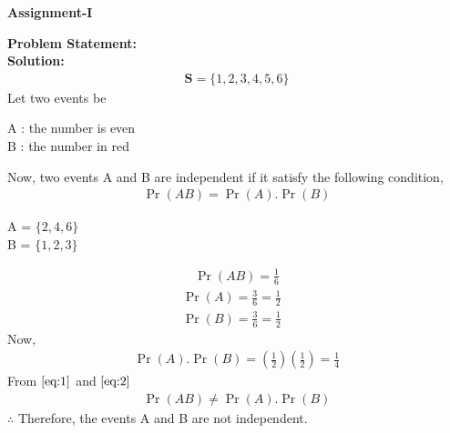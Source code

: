 \documentclass[10pt,a4paper]{report}
\providecommand{\pr}[1]{\ensuremath{\Pr\left(#1\right)}}
\newcommand{\problem}{\noindent \textbf{Problem Statement: }}
\newcommand{\solution}{\noindent \textbf{Solution: }}
\let\vec\mathbf
\let\vec\mathbf
\begin{document}
\hspace{8.05cm}\textbf{Assignment-I}
\begin{multicols}{2}
\problem\vspace{2mm}
\vspace{5mm}\\
\solution\vspace{2mm}
\\
\begin{align}
\vec{S}= \{1,2,3,4,5,6\}
\end{align}
Let two events be
\begin{center}
A : the number is even\\
B : the number in red\\
\end{center}
Now, two events A and B are independent if it satisfy the following condition,
\begin{align}
\pr{AB} = \pr{A}.\pr{B}
\end{align}
\begin{center} 
A = $\{2,4,6\}$\\
B = $\{1,2,3\}$\\
\end{center}
\begin{align}
\pr{AB} = \frac{1}{6} \label{eq:1}
\end{align}
\begin{align}
\pr{A} = \frac{3}{6}=\frac{1}{2}&  
\\
\pr{B} = \frac{3}{6}=\frac{1}{2}&  
\end{align}
Now, 
\begin{align}
\pr{A}.\pr{B} =\left(\frac{1}{2}\right)\left(\frac{1}{2}\right)=\frac{1}{4}    \label{eq:2} 
\end{align}
From $\eqref{eq:1}$ and $\eqref{eq:2}$
\begin{align}
\pr{AB} \neq \pr{A}.\pr{B}
\end{align}
$\therefore$ Therefore, the events A and B are not independent.
\end{multicols}
\end{document}
